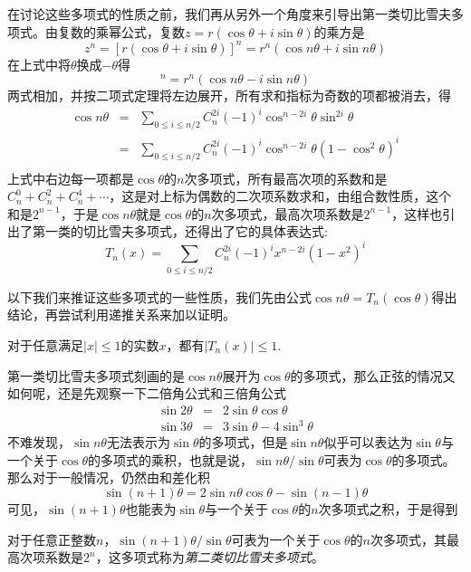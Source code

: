 在讨论这些多项式的性质之前，我们再从另外一个角度来引导出第一类切比雪夫多项式。由复数的乘幂公式，复数$z=r(\cos{\theta}+i\sin{\theta})$的乘方是
\begin{equation*}
  z^n=[r(\cos{\theta}+i\sin{\theta})]^n = r^n(\cos{n\theta}+i\sin{n\theta})
\end{equation*}
在上式中将$\theta$换成$-\theta$得
\begin{equation*}
  [r(\cos{\theta}-i\sin{\theta})]^n = r^n(\cos{n\theta}-i\sin{n\theta})
\end{equation*}
两式相加，并按二项式定理将左边展开，所有求和指标为奇数的项都被消去，得
\begin{eqnarray*}
  \cos{n\theta} & = & \sum_{0 \leqslant i \leqslant n/2}C_n^{2i}(-1)^i\cos^{n-2i}{\theta}\sin^{2i}{\theta} \\
  & = & \sum_{0 \leqslant i \leqslant n/2}C_n^{2i}(-1)^i\cos^{n-2i}{\theta}(1-\cos^2{\theta})^i \\
\end{eqnarray*}
上式中右边每一项都是$\cos{\theta}$的$n$次多项式，所有最高次项的系数和是$C_n^0+C_n^2+C_n^4+\cdots$，这是对上标为偶数的二次项系数求和，由组合数性质，这个和是$2^{n-1}$，于是$\cos{n\theta}$就是$\cos{\theta}$的$n$次多项式，最高次项系数是$2^{n-1}$，这样也引出了第一类的切比雪夫多项式，还得出了它的具体表达式:
\begin{equation*}
  T_n(x) = \sum_{0 \leqslant i \leqslant n/2}C_n^{2i}(-1)^ix^{n-2i}(1-x^2)^{i}
\end{equation*}

以下我们来推证这些多项式的一些性质，我们先由公式$\cos{n\theta}=T_n(\cos{\theta})$得出结论，再尝试利用递推关系来加以证明。

\begin{property}
  对于任意满足$|x|\leqslant 1$的实数$x$，都有$|T_n(x)| \leqslant 1$.
\end{property}

第一类切比雪夫多项式刻画的是$\cos{n\theta}$展开为$\cos{\theta}$的多项式，那么正弦的情况又如何呢，还是先观察一下二倍角公式和三倍角公式
\begin{eqnarray*}
  \sin{2\theta} & = & 2\sin{\theta}\cos{\theta} \\
  \sin{3\theta} & = & 3\sin{\theta}-4\sin^3{\theta}
\end{eqnarray*}
不难发现，$\sin{n\theta}$无法表示为$\sin{\theta}$的多项式，但是$\sin{n\theta}$似乎可以表达为$\sin{\theta}$与一个关于$\cos{\theta}$的多项式的乘积，也就是说，$\sin{n\theta}/\sin{\theta}$可表为$\cos{\theta}$的多项式。那么对于一般情况，仍然由和差化积
\begin{equation*}
  \sin{(n+1)\theta}=2\sin{n\theta}\cos{\theta}-\sin{(n-1)\theta}
\end{equation*}
可见，$\sin{(n+1)\theta}$也能表为$\sin{\theta}$与一个关于$\cos{\theta}$的$n$次多项式之积，于是得到
\begin{theorem}
  对于任意正整数$n$，$\sin{(n+1)\theta}/\sin{\theta}$可表为一个关于$\cos{\theta}$的$n$次多项式，其最高次项系数是$2^n$，这多项式称为\emph{第二类切比雪夫多项式}。
\end{theorem}

